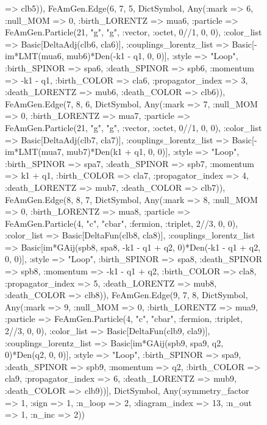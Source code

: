 \documentclass{revtex4}
\begin{document}
\begin{figure}[!htb]
\begin{center}
{=> clb5)), FeAmGen.Edge(6, 7, 5, Dict{Symbol, Any}(:mark => 6, :null_MOM => 0, :birth_LORENTZ => mua6, :particle => FeAmGen.Particle(21, "g", "g", :vector, :octet, 0//1, 0, 0), :color_list => Basic[DeltaAdj(clb6, cla6)], :couplings_lorentz_list => Basic[-im*LMT(mua6, mub6)*Den(-k1 - q1, 0, 0)], :style => "Loop", :birth_SPINOR => spa6, :death_SPINOR => spb6, :momentum => -k1 - q1, :birth_COLOR => cla6, :propagator_index => 3, :death_LORENTZ => mub6, :death_COLOR => clb6)), FeAmGen.Edge(7, 8, 6, Dict{Symbol, Any}(:mark => 7, :null_MOM => 0, :birth_LORENTZ => mua7, :particle => FeAmGen.Particle(21, "g", "g", :vector, :octet, 0//1, 0, 0), :color_list => Basic[DeltaAdj(clb7, cla7)], :couplings_lorentz_list => Basic[-im*LMT(mua7, mub7)*Den(k1 + q1, 0, 0)], :style => "Loop", :birth_SPINOR => spa7, :death_SPINOR => spb7, :momentum => k1 + q1, :birth_COLOR => cla7, :propagator_index => 4, :death_LORENTZ => mub7, :death_COLOR => clb7)), FeAmGen.Edge(8, 8, 7, Dict{Symbol, Any}(:mark => 8, :null_MOM => 0, :birth_LORENTZ => mua8, :particle => FeAmGen.Particle(4, "c", "cbar", :fermion, :triplet, 2//3, 0, 0), :color_list => Basic[DeltaFun(clb8, cla8)], :couplings_lorentz_list => Basic[im*GAij(spb8, spa8, -k1 - q1 + q2, 0)*Den(-k1 - q1 + q2, 0, 0)], :style => "Loop", :birth_SPINOR => spa8, :death_SPINOR => spb8, :momentum => -k1 - q1 + q2, :birth_COLOR => cla8, :propagator_index => 5, :death_LORENTZ => mub8, :death_COLOR => clb8)), FeAmGen.Edge(9, 7, 8, Dict{Symbol, Any}(:mark => 9, :null_MOM => 0, :birth_LORENTZ => mua9, :particle => FeAmGen.Particle(4, "c", "cbar", :fermion, :triplet, 2//3, 0, 0), :color_list => Basic[DeltaFun(clb9, cla9)], :couplings_lorentz_list => Basic[im*GAij(spb9, spa9, q2, 0)*Den(q2, 0, 0)], :style => "Loop", :birth_SPINOR => spa9, :death_SPINOR => spb9, :momentum => q2, :birth_COLOR => cla9, :propagator_index => 6, :death_LORENTZ => mub9, :death_COLOR => clb9))], Dict{Symbol, Any}(:symmetry_factor => 1, :sign => 1, :n_loop => 2, :diagram_index => 13, :n_out => 1, :n_inc => 2)) 
}
\end{center}
\end{figure}
\end{document}

